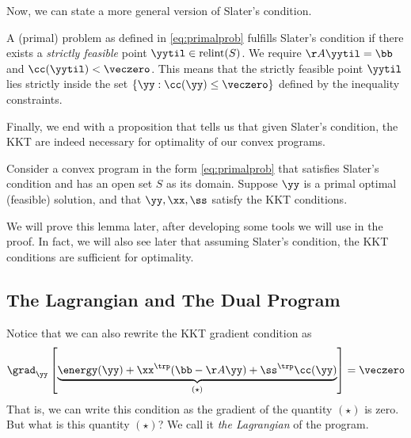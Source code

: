 Now, we can state a more general version of Slater's condition.

\begin{definition} \label{def:slatergeneral}
A (primal) problem as defined in \eqref{eq:primalprob} fulfills
Slater's condition if there exists a \emph{strictly feasible} point
$\yytil \in \operatorname{relint}(S)$.
We require $\AA\yytil = \bb$ and $\cc(\yytil) <
\veczero$.
This means that the strictly feasible point $\yytil$ lies strictly inside the set $\{\yy : \cc(\yy) \leq \veczero\}$ defined by the inequality constraints.
\end{definition}

Finally, we end with a proposition that tells us that given Slater's
condition, the KKT are indeed necessary for optimality of our convex programs.

\begin{proposition}
  \label{pro:KKTnecessary}
  Consider a convex program in the form \eqref{eq:primalprob} that
  satisfies Slater's condition and has an open set $S$ as its domain.
  Suppose $\yy$ is a primal optimal (feasible) solution, and that
  $\yy, \xx, \ss$ satisfy the KKT conditions.
\end{proposition}

We will prove this lemma later, after developing some tools we will
use in the proof.
In fact, we will also see later that assuming Slater's condition, the KKT
conditions are sufficient for optimality.

\subsection{The Lagrangian and The Dual Program}

Notice that we can also rewrite the KKT gradient condition as
\[
  \grad_{\yy}
  \left[ \underbrace{\energy(\yy) + \xx^{\trp}(\bb-\AA\yy) +
      \ss^{\trp}\cc(\yy)
    }_{(\star)}
    \right]
= \veczero
  \]
That is, we can write this condition as the gradient of the quantity
$(\star)$ is zero.
But what is this quantity $(\star)$?
We call it \emph{the Lagrangian} of the program.

